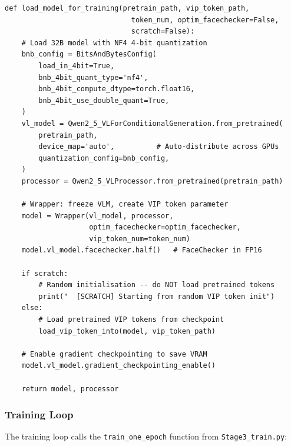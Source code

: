 \documentclass[12pt,a4paper]{article}
\begin{document}
\begin{lstlisting}[caption={adversarial\_training.py -- Model loading with 4-bit quantization}]
def load_model_for_training(pretrain_path, vip_token_path,
                              token_num, optim_facechecker=False,
                              scratch=False):
    # Load 32B model with NF4 4-bit quantization
    bnb_config = BitsAndBytesConfig(
        load_in_4bit=True,
        bnb_4bit_quant_type='nf4',
        bnb_4bit_compute_dtype=torch.float16,
        bnb_4bit_use_double_quant=True,
    )
    vl_model = Qwen2_5_VLForConditionalGeneration.from_pretrained(
        pretrain_path,
        device_map='auto',          # Auto-distribute across GPUs
        quantization_config=bnb_config,
    )
    processor = Qwen2_5_VLProcessor.from_pretrained(pretrain_path)

    # Wrapper: freeze VLM, create VIP token parameter
    model = Wrapper(vl_model, processor,
                    optim_facechecker=optim_facechecker,
                    vip_token_num=token_num)
    model.vl_model.facechecker.half()   # FaceChecker in FP16

    if scratch:
        # Random initialisation -- do NOT load pretrained tokens
        print("  [SCRATCH] Starting from random VIP token init")
    else:
        # Load pretrained VIP tokens from checkpoint
        load_vip_token_into(model, vip_token_path)

    # Enable gradient checkpointing to save VRAM
    model.vl_model.gradient_checkpointing_enable()

    return model, processor
\end{lstlisting}

\subsubsection{Training Loop}

The training loop calls the \texttt{train\_one\_epoch} function from \texttt{Stage3\_train.py}:
\end{document}
